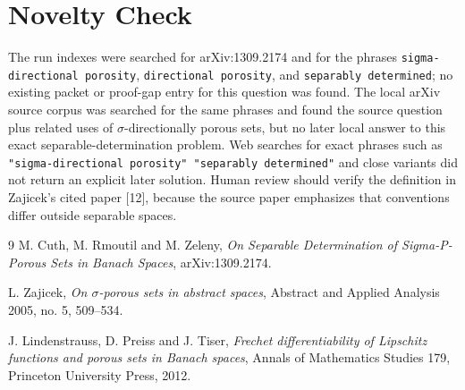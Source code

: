 \documentclass[11pt]{article}
\begin{document}
\section*{Novelty Check}

The run indexes were searched for arXiv:1309.2174 and for the phrases
\texttt{sigma-directional porosity}, \texttt{directional porosity}, and
\texttt{separably determined}; no existing packet or proof-gap entry for this
question was found.  The local arXiv source corpus was searched for the same
phrases and found the source question plus related uses of
$\sigma$-directionally porous sets, but no later local answer to this exact
separable-determination problem.  Web searches for exact phrases such as
\texttt{"sigma-directional porosity" "separably determined"} and close variants
did not return an explicit later solution.  Human review should verify the
definition in Zajicek's cited paper [12], because the source paper emphasizes
that conventions differ outside separable spaces.

\begin{thebibliography}{9}
M. Cuth, M. Rmoutil and M. Zeleny,
\emph{On Separable Determination of Sigma-P-Porous Sets in Banach Spaces},
arXiv:1309.2174.

L. Zajicek,
\emph{On $\sigma$-porous sets in abstract spaces},
Abstract and Applied Analysis 2005, no. 5, 509--534.

J. Lindenstrauss, D. Preiss and J. Tiser,
\emph{Frechet differentiability of Lipschitz functions and porous sets in
Banach spaces}, Annals of Mathematics Studies 179, Princeton University Press,
2012.
\end{thebibliography}
\end{document}
